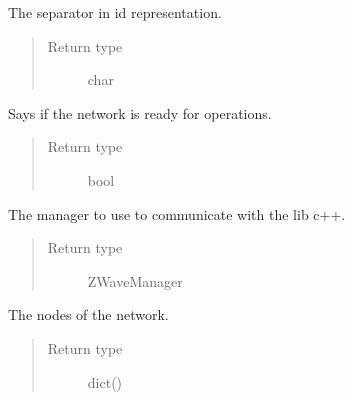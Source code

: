 \documentclass[letterpaper,10pt,english]{sphinxmanual}
\begin{document}
\begin{fulllineitems}
\begin{fulllineitems}
\end{fulllineitems}


\begin{fulllineitems}
\label{network:openzwave.network.ZWaveNetwork.id_separator}
The separator in id representation.
\begin{quote}\begin{description}
\item[{Return type}] \leavevmode
char

\end{description}\end{quote}

\end{fulllineitems}


\begin{fulllineitems}
\label{network:openzwave.network.ZWaveNetwork.is_ready}
Says if the network is ready for operations.
\begin{quote}\begin{description}
\item[{Return type}] \leavevmode
bool

\end{description}\end{quote}

\end{fulllineitems}


\begin{fulllineitems}
\label{network:openzwave.network.ZWaveNetwork.manager}
The manager to use to communicate with the lib c++.
\begin{quote}\begin{description}
\item[{Return type}] \leavevmode
ZWaveManager

\end{description}\end{quote}

\end{fulllineitems}


\begin{fulllineitems}
\label{network:openzwave.network.ZWaveNetwork.nodes}
The nodes of the network.
\begin{quote}\begin{description}
\item[{Return type}] \leavevmode
dict()


\end{description}
\end{quote}
\end{fulllineitems}
\end{fulllineitems}
\end{document}
